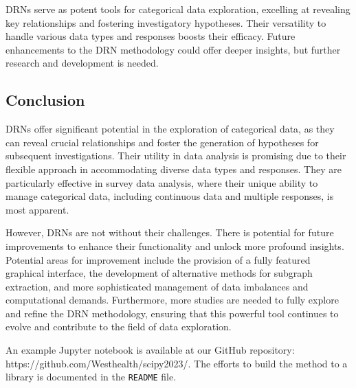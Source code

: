 DRNs serve as potent tools for categorical data exploration, excelling at revealing key relationships and fostering investigatory hypotheses. Their versatility to handle various data types and responses boosts their efficacy. Future enhancements to the DRN methodology could offer deeper insights, but further research and development is needed.

\subsection{Conclusion \label{Conclusion}}

DRNs offer significant potential in the exploration of categorical data, as they can reveal crucial relationships and foster the generation of hypotheses for subsequent investigations. Their utility in data analysis is promising due to their flexible approach in accommodating diverse data types and responses. They are particularly effective in survey data analysis, where their unique ability to manage categorical data, including continuous data and multiple responses, is most apparent.

However, DRNs are not without their challenges. There is potential for future improvements to enhance their functionality and unlock more profound insights. Potential areas for improvement include the provision of a fully featured graphical interface, the development of alternative methods for subgraph extraction, and more sophisticated management of data imbalances and computational demands. Furthermore, more studies are needed to fully explore and refine the DRN methodology, ensuring that this powerful tool continues to evolve and contribute to the field of data exploration.

An example Jupyter notebook is available at our GitHub repository: https://github.com/Westhealth/scipy2023/. The efforts to build the method to a library is documented in the \texttt{README} file. 

